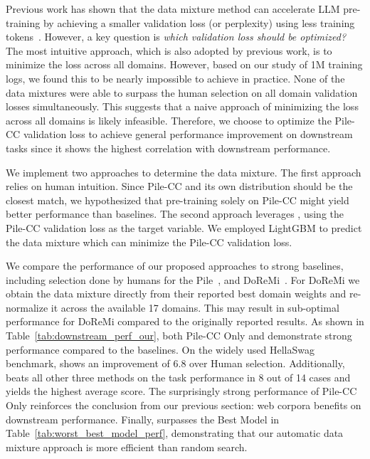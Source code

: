 Previous work has shown that the data mixture method can accelerate LLM pre-training by achieving a smaller validation loss (or perplexity) using less training tokens~\citep{xie2023doremi}. However, a key question is \textit{which validation loss should be optimized?}
The most intuitive approach, which is also adopted by previous work, is to minimize the loss across all domains. However, based on our study of 1M training logs, we found this to be nearly impossible to achieve in practice. None of the data mixtures were able to surpass the human selection on all domain validation losses simultaneously. This suggests that a naive approach of minimizing the loss across all domains is likely infeasible. Therefore, we choose to optimize the Pile-CC validation loss to achieve general performance improvement on downstream tasks since it shows the highest correlation with downstream performance.

We implement two approaches to determine the data mixture.
The first approach relies on human intuition.
Since Pile-CC and its own distribution should be the closest match, we hypothesized that pre-training solely on Pile-CC might yield better performance than baselines.
The second approach leverages \ourmethod, using the Pile-CC validation loss as the target variable. We employed LightGBM to predict the data mixture which can minimize the Pile-CC validation loss. 

We compare the performance of our proposed approaches to strong baselines, including selection done by humans for the Pile~\citep{the_pile_corpus}, and DoReMi~\citep{xie2023doremi}. For DoReMi we obtain the data mixture directly from their reported best domain weights and re-normalize it across the available 17 domains. This may result in sub-optimal performance for DoReMi compared to the originally reported results. As shown in Table~\ref{tab:downstream_perf_our}, both Pile-CC Only and \ourmethod demonstrate strong performance compared to the baselines. On the widely used HellaSwag benchmark, \ourmethod shows an improvement of $6.8$ over Human selection. Additionally, \ourmethod beats all other three methods on the task performance in 8 out of 14 cases and yields the highest average score. The surprisingly strong performance of Pile-CC Only reinforces the conclusion from our previous section: web corpora benefits on downstream performance. Finally, \ourmethod surpasses the Best Model in Table~\ref{tab:worst_best_model_perf}, demonstrating that our automatic data mixture approach is more efficient than random search.


